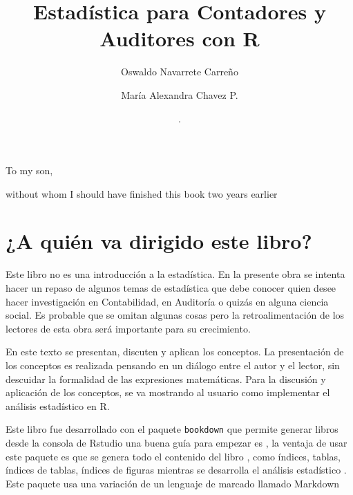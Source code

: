\documentclass[
]{krantz}
\title{Estadística para Contadores y Auditores con R}
\author{Oswaldo Navarrete Carreño \and María Alexandra Chavez P.}
\date{.}
\begin{document}
\maketitle


\thispagestyle{empty}

\begin{center}
To my son,

without whom I should have finished this book two years earlier
\end{center}

\setlength{\abovedisplayskip}{-5pt}
\setlength{\abovedisplayshortskip}{-5pt}

{
\setcounter{tocdepth}{2}
\tableofcontents
}
\hypertarget{a-quien-va-dirigido-este-libro}{%
\chapter{¿A quién va dirigido este libro?}\label{a-quien-va-dirigido-este-libro}}

Este libro no es una introducción a la estadística. En la presente obra se intenta hacer un repaso de algunos temas de estadística que debe conocer quien desee hacer investigación en Contabilidad, en Auditoría o quizás en alguna ciencia social. Es probable que se omitan algunas cosas pero la retroalimentación de los lectores de esta obra será importante para su crecimiento.

En este texto se presentan, discuten y aplican los conceptos. La presentación de los conceptos es realizada pensando en un diálogo entre el autor y el lector, sin descuidar la formalidad de las expresiones matemáticas. Para la discusión y aplicación de los conceptos, se va mostrando al usuario como implementar el análisis estadístico en R.

Este libro fue desarrollado con el paquete \texttt{bookdown} que permite generar libros desde la consola de Rstudio una buena guía para empezar es \citet{R-bookdown}, la ventaja de usar este paquete es que se genera todo el contenido del libro \citep{xie2015}, como índices, tablas, índices de tablas, índices de figuras mientras se desarrolla el análisis estadístico \citep{R-knitr}. Este paquete usa una variación de un lenguaje de marcado llamado Markdown \citep{R-rmarkdown}
\end{document}
